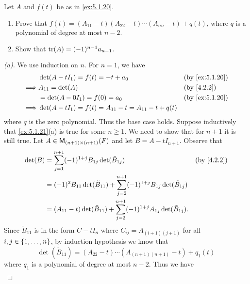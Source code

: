 \begin{ex}\label{ex:5.1.21}
  Let \(A\) and \(f(t)\) be as in \cref{ex:5.1.20}.
  \begin{enumerate}
    \item Prove that \(f(t) = (A_{1 1} - t)(A_{2 2} - t) \cdots (A_{n n} - t) + q(t)\), where \(q\) is a polynomial of degree at most \(n - 2\).
    \item Show that \(\tr(A) = (-1)^{n - 1} a_{n - 1}\).
  \end{enumerate}
\end{ex}

\begin{proof}[(a)]
  We use induction on \(n\).
  For \(n = 1\), we have
  \begin{align*}
             & \det(A - t I_1) = f(t) = -t + a_0                         &  & \by{ex:5.1.20} \\
    \implies & A_{1 1} = \det(A)                                         &  & \by{4.2.2}     \\
             & = \det(A - 0 I_1) = f(0) = a_0                            &  & \by{ex:5.1.20} \\
    \implies & \det(A - t I_1) = f(t) = A_{1 1} - t = A_{1 1} - t + q(t)
  \end{align*}
  where \(q\) is the zero polynomial.
  Thus the base case holds.
  Suppose inductively that \cref{ex:5.1.21}(a) is true for some \(n \geq 1\).
  We need to show that for \(n + 1\) it is still true.
  Let \(A \in \ms[(n + 1)][(n + 1)][\F]\) and let \(B = A - t I_{n + 1}\).
  Observe that
  \begin{align*}
    \det(B) & = \sum_{j = 1}^{n + 1} (-1)^{1 + j} B_{1 j} \det(\tilde{B}_{1 j})                                          &  & \by{4.2.2} \\
            & = (-1)^{2} B_{1 1} \det(\tilde{B}_{1 1}) + \sum_{j = 2}^{n + 1} (-1)^{1 + j} B_{1 j} \det(\tilde{B}_{1 j})                 \\
            & = (A_{1 1} - t) \det(\tilde{B}_{1 1}) + \sum_{j = 2}^{n + 1} (-1)^{1 + j} A_{1 j} \det(\tilde{B}_{1 j}).
  \end{align*}
  Since \(\tilde{B}_{1 1}\) is in the form \(C - t I_n\) where \(C_{i j} = A_{(i + 1) (j + 1)}\) for all \(i, j \in \left\lbrace1, \dots, n\right\rbrace\), by induction hypothesis we know that
  \[
    \det(\tilde{B}_{1 1}) = (A_{2 2} - t) \cdots (A_{(n + 1) (n + 1)} - t) + q_1(t)
  \]
  where \(q_1\) is a polynomial of degree at most \(n - 2\).
  Thus we have
  \begin{align*}

\end{align*}
\end{proof}
